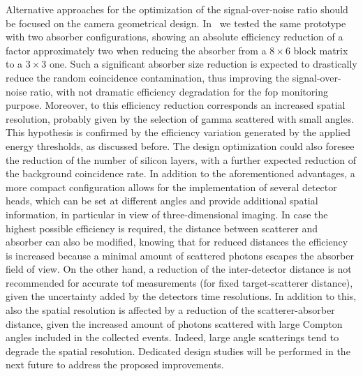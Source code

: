 Alternative approaches for the optimization of the signal-over-noise ratio should be focused on the camera geometrical design. In~\cite{Fontana2017_APPB} we tested the same prototype with two absorber configurations, showing an absolute efficiency reduction of a factor approximately two when reducing the absorber from a $8\times6$ block matrix to a $3\times3$ one. Such a significant absorber size reduction is expected to drastically reduce the random coincidence contamination, thus improving the signal-over-noise ratio, with not dramatic efficiency degradation for the \gls{fop} monitoring purpose. Moreover, to this efficiency reduction corresponds an increased spatial resolution, probably given by the selection of gamma scattered with small angles. This hypothesis is confirmed by the efficiency variation generated by the applied energy thresholds, as discussed before. 
The design optimization could also foresee the reduction of the number of silicon layers, with a further expected reduction of the background coincidence rate. In addition to the aforementioned advantages, a more compact configuration allows for the implementation of several detector heads, which can be set at different angles and provide additional spatial information, in particular in view of three-dimensional imaging. In case the highest possible efficiency is required, the distance between scatterer and absorber can also be modified, knowing that for reduced distances the efficiency is increased because a minimal amount of scattered photons escapes the absorber field of view. On the other hand, a reduction of the inter-detector distance is not recommended for accurate \gls{tof} measurements (for fixed target-scatterer distance), given the uncertainty added by the detectors time resolutions. In addition to this, also the spatial resolution is affected by a reduction of the scatterer-absorber distance, given the increased amount of photons scattered with large Compton angles included in the collected events. Indeed, large angle scatterings tend to degrade the spatial resolution. Dedicated design studies will be performed in the next future to address the proposed improvements.  


